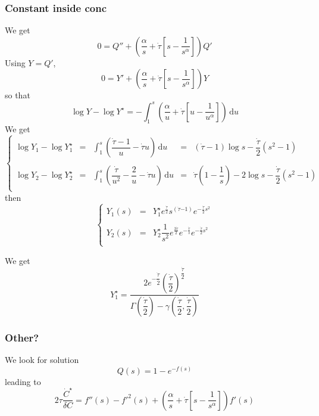 \documentclass[11pt]{revtex4}
\begin{document}
\subsubsection{Constant inside conc}
We get
\begin{equation}
 0 = Q'' + \left( \dfrac{\alpha}{s} + \dot{\tau} \left[s-\dfrac{1}{s^\alpha}\right]\right) Q'
\end{equation}
Using $Y=Q'$,
\begin{equation}
	0 = Y' + \left( \dfrac{\alpha}{s} + \dot{\tau} \left[s-\dfrac{1}{s^\alpha}\right]\right) Y
\end{equation}
so that
\begin{equation}
	\log Y - \log Y^\star = -\int_{1}^s \left( \dfrac{\alpha}{u} + \dot{\tau} \left[u-\dfrac{1}{u^\alpha}\right]\right) \, \mathrm{d}u
\end{equation}
We get
\begin{equation}
\left\lbrace
\begin{array}{rclcl}
\log Y_1 - \log Y^\star_1 & = &\int_{1}^s \left( \dfrac{\dot{\tau}-1}{u} - \dot{\tau} u \right) \, \mathrm{d}u & = & (\dot{\tau}-1) \log s - \dfrac{\dot{\tau}}{2}(s^2-1)\\
\\
\log Y_2 - \log Y^\star_2 & = &\int_{1}^s \left( \dfrac{\dot{\tau}}{u^2} - \dfrac{2}{u} - \dot{\tau} u \right) \, \mathrm{d}u & = & \dot{\tau}\left(1-\dfrac{1}{s}\right)-2 \log s - \dfrac{\dot{\tau}}{2}(s^2-1)\\
\end{array}
\right.
\end{equation}
then
\begin{equation}
\left\lbrace
\begin{array}{rcl}
Y_1(s) & = & Y^\star_1 e^{\frac{\dot{\tau}}{2}} s^{(\dot{\tau}{-1})} e^{-\frac{\dot{\tau}}{2}s^2}\\
\\
Y_2(s) & = & Y^\star_2 \dfrac{1}{s^2} e^{\frac{3\dot{\tau}}{2}} e^{-\frac{\dot{\tau}}{s}} e^{-\frac{\dot{\tau}}{2}s^2}\\
\end{array}
\right.
\end{equation}

We get
\begin{equation}
	Y_1^\star = \dfrac{
		2e^{-\dfrac{\dot{\tau}}{2}}
		\left(\dfrac{\dot{\tau}}{2}\right)^{\dfrac{\dot{\tau}}{2}}
	}
	{\Gamma\left(\dfrac{\dot{\tau}}{2}\right)-\gamma\left(\dfrac{\dot{\tau}}{2},\dfrac{\dot{\tau}}{2}\right)}
\end{equation}



\subsubsection{Other?}
We look for solution
\begin{equation}
	Q(s) = 1 - e^{-f(s)}
\end{equation}
leading to
\begin{equation}
	2\tau \dfrac{\dot{C}^\star}{\delta C} = f''(s) - f'^2(s) + \left( \dfrac{\alpha}{s} + \dot{\tau} \left[s-\dfrac{1}{s^\alpha}\right]\right) f'(s)
\end{equation}
\end{document}
